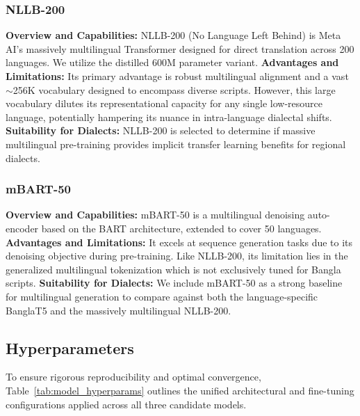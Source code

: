 \documentclass[12pt,a4paper]{article}
\begin{document}
\subsubsection{NLLB-200}
\textbf{Overview and Capabilities:} NLLB-200 \cite{nllb2022} (No Language Left Behind) is Meta AI's massively multilingual Transformer designed for direct translation across 200 languages. We utilize the distilled 600M parameter variant.
\textbf{Advantages and Limitations:} Its primary advantage is robust multilingual alignment and a vast $\sim$256K vocabulary designed to encompass diverse scripts. However, this large vocabulary dilutes its representational capacity for any single low-resource language, potentially hampering its nuance in intra-language dialectal shifts.
\textbf{Suitability for Dialects:} NLLB-200 is selected to determine if massive multilingual pre-training provides implicit transfer learning benefits for regional dialects.

\subsubsection{mBART-50}
\textbf{Overview and Capabilities:} mBART-50 \cite{tang2020multilingual} is a multilingual denoising auto-encoder based on the BART \cite{lewis2020bart} architecture, extended to cover 50 languages.
\textbf{Advantages and Limitations:} It excels at sequence generation tasks due to its denoising objective during pre-training. Like NLLB-200, its limitation lies in the generalized multilingual tokenization which is not exclusively tuned for Bangla scripts.
\textbf{Suitability for Dialects:} We include mBART-50 as a strong baseline for multilingual generation to compare against both the language-specific BanglaT5 and the massively multilingual NLLB-200.

\subsection{Hyperparameters}
To ensure rigorous reproducibility and optimal convergence, Table~\ref{tab:model_hyperparams} outlines the unified architectural and fine-tuning configurations applied across all three candidate models.
\end{document}
